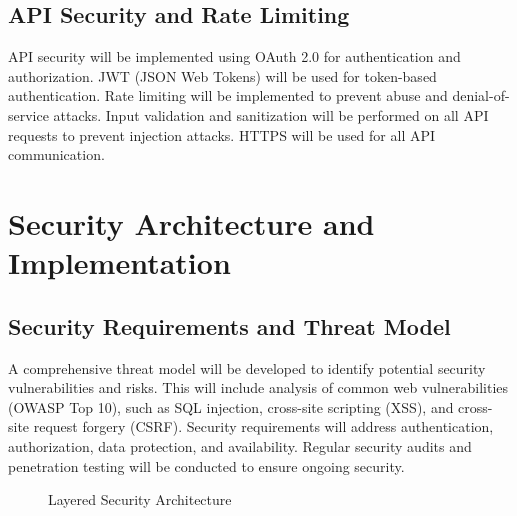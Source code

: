\documentclass[11pt,a4paper,oneside]{article}
\begin{document}
\subsection{API Security and Rate Limiting}

API security will be implemented using OAuth 2.0 for authentication and authorization.  JWT (JSON Web Tokens) will be used for token-based authentication.  Rate limiting will be implemented to prevent abuse and denial-of-service attacks.  Input validation and sanitization will be performed on all API requests to prevent injection attacks.  HTTPS will be used for all API communication.

\section{Security Architecture and Implementation}

\subsection{Security Requirements and Threat Model}

A comprehensive threat model will be developed to identify potential security vulnerabilities and risks.  This will include analysis of common web vulnerabilities (OWASP Top 10), such as SQL injection, cross-site scripting (XSS), and cross-site request forgery (CSRF).  Security requirements will address authentication, authorization, data protection, and availability.  Regular security audits and penetration testing will be conducted to ensure ongoing security.

\begin{figure}[H]
\centering
{}
\caption{Layered Security Architecture}
\label{fig:security}
\end{figure}
\end{document}

